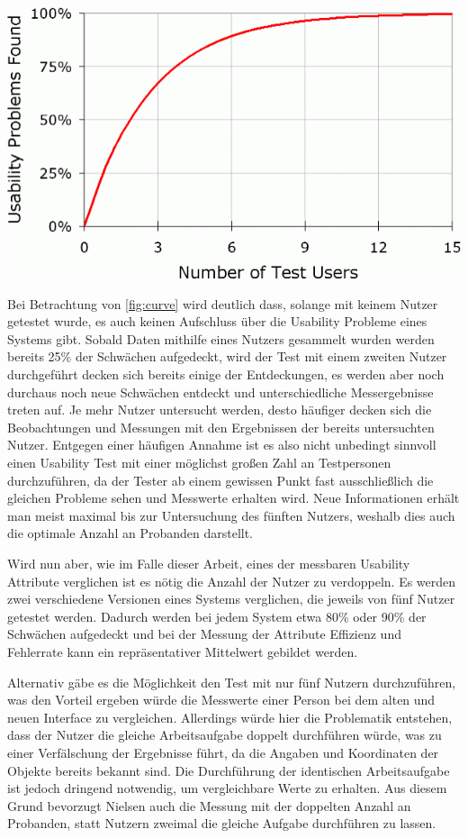\begin{center}
  \includegraphics[width=0.7\linewidth]{figures/curve1.png}
  \label{fig:curve}
\end{center}

Bei Betrachtung von \ref{fig:curve} wird deutlich dass, solange mit keinem Nutzer getestet wurde, es auch keinen Aufschluss über die Usability Probleme eines Systems gibt.
Sobald Daten mithilfe eines Nutzers gesammelt wurden werden bereits 25\% der Schwächen aufgedeckt, wird der Test mit einem zweiten Nutzer durchgeführt decken sich bereits einige der Entdeckungen, es werden aber noch durchaus noch neue Schwächen entdeckt und unterschiedliche Messergebnisse treten auf.
Je mehr Nutzer untersucht werden, desto häufiger decken sich die Beobachtungen und Messungen mit den Ergebnissen der bereits untersuchten Nutzer.\cite{.h}
Entgegen einer häufigen Annahme ist es also nicht unbedingt sinnvoll einen Usability Test mit einer möglichst großen Zahl an Testpersonen durchzuführen, da der Tester ab einem gewissen Punkt fast ausschließlich die gleichen Probleme sehen und Messwerte erhalten wird.
Neue Informationen erhält man meist maximal bis zur Untersuchung des fünften Nutzers, weshalb dies auch die optimale Anzahl an Probanden darstellt.

Wird nun aber, wie im Falle dieser Arbeit, eines der messbaren Usability Attribute verglichen ist es nötig die Anzahl der Nutzer zu verdoppeln.
Es werden zwei verschiedene Versionen eines Systems verglichen, die jeweils von fünf Nutzer getestet werden.
Dadurch werden bei jedem System etwa 80\% oder 90\% der Schwächen aufgedeckt und bei der Messung der Attribute Effizienz und Fehlerrate kann ein repräsentativer Mittelwert gebildet werden.

Alternativ gäbe es die Möglichkeit den Test mit nur fünf Nutzern durchzuführen, was den Vorteil ergeben würde die Messwerte einer Person bei dem alten und neuen Interface zu vergleichen.
Allerdings würde hier die Problematik entstehen, dass der Nutzer die gleiche Arbeitsaufgabe doppelt durchführen würde, was zu einer Verfälschung der Ergebnisse führt, da die Angaben und Koordinaten der Objekte bereits bekannt sind.
Die Durchführung der identischen Arbeitsaufgabe ist jedoch dringend notwendig, um vergleichbare Werte zu erhalten.
Aus diesem Grund bevorzugt Nielsen auch die Messung mit der doppelten Anzahl an Probanden, statt Nutzern zweimal die gleiche Aufgabe durchführen zu lassen.\cite{.h}

